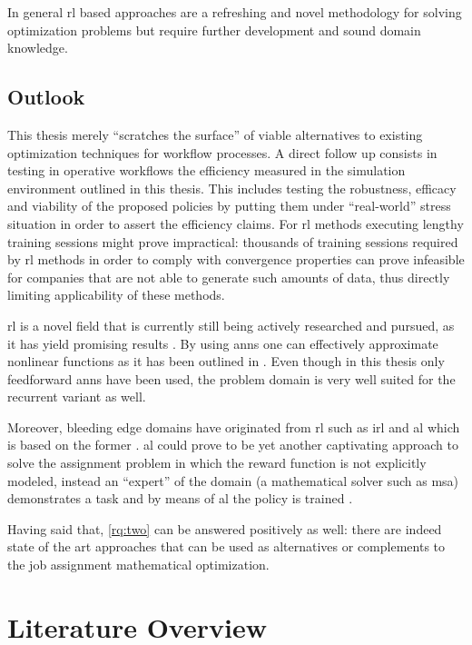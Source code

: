 \documentclass{seal_thesis}
\begin{document}
In general \gls{rl} based approaches are a refreshing and novel methodology for solving optimization problems but require further development and sound domain knowledge.

\section{Outlook}

This thesis merely ``scratches the surface'' of viable alternatives to existing optimization techniques for workflow processes. A direct follow up consists in testing in operative workflows the efficiency measured in the simulation environment outlined in this thesis. This includes testing the robustness, efficacy and viability of the proposed policies by putting them under ``real-world'' stress situation in order to assert the efficiency claims. For \gls{rl} methods executing lengthy training sessions might prove impractical: thousands of training sessions required by \gls{rl} methods in order to comply with convergence properties can prove infeasible for companies that are not able to generate such amounts of data, thus directly limiting applicability of these methods.

\gls{rl} is a novel field that is currently still being actively researched and pursued, as it has yield promising results \cite{Mnih2015,Silver2016}. By using \glspl{ann} one can effectively approximate nonlinear functions as it has been outlined in . Even though in this thesis only feedforward \glspl{ann} have been used, the problem domain is very well suited for the recurrent variant as well.

Moreover, bleeding edge domains have originated from \gls{rl} such as \gls{irl} \cite{Ng2000} and \gls{al} which is based on the former \cite{Abbeel2004}. \gls{al} could prove to be yet another captivating approach to solve the assignment problem in which the reward function is not explicitly modeled, instead an ``expert'' of the domain (\ie a mathematical solver such as \gls{msa}) demonstrates a task and by means of \gls{al} the policy is trained \cite{Abbeel2004}.

Having said that, \ref{rq:two} can be answered positively as well: there are indeed state of the art approaches that can be used as alternatives or complements to the job assignment mathematical optimization. 

\appendix

\chapter{Literature Overview}
\end{document}
